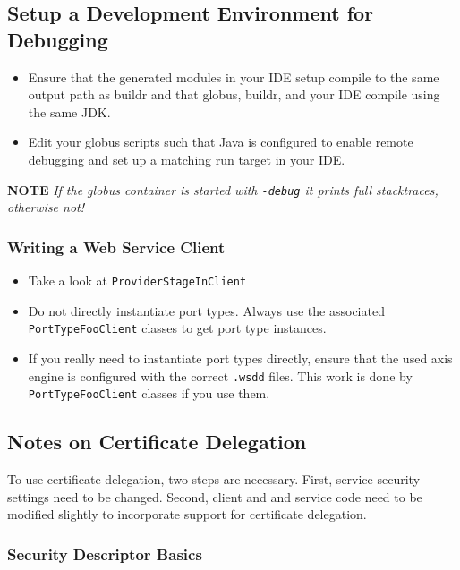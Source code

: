 \documentclass{article}
\begin{document}
\subsection{Setup a Development Environment for Debugging}

\begin{itemize}
\item
  Ensure that the generated modules in your IDE setup compile to the
  same output path as buildr and that globus, buildr, and your IDE
  compile using the same JDK.

\item
  Edit your globus scripts such that Java is configured to enable
  remote debugging and set up a matching run target in your IDE.

\end{itemize}
\textbf{NOTE}
\emph{If the globus container is started with \texttt{-debug} it prints full stacktraces, otherwise not!}

\subsubsection{Writing a Web Service Client}

\begin{itemize}
\item
  Take a look at \verb!ProviderStageInClient!
\item
  Do not directly instantiate port types. Always use the associated
  \verb!PortTypeFooClient! classes to get port type instances.
\item
  If you really need to instantiate port types directly, ensure that
  the used axis engine is configured with the correct \verb!.wsdd!
  files. This work is done by \verb!PortTypeFooClient! classes if you
  use them.
\end{itemize}
\subsection{Notes on Certificate Delegation}

To use certificate delegation, two steps are necessary. First,
service security settings need to be changed. Second, client and
and service code need to be modified slightly to incorporate
support for certificate delegation.

\subsubsection{Security Descriptor Basics}
\end{document}
